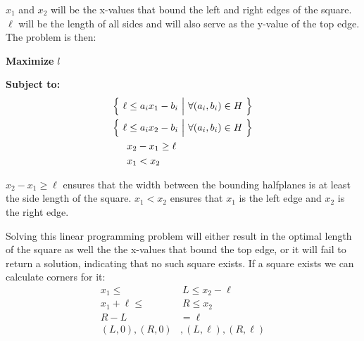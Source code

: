 \documentclass[11pt]{article}
\begin{document}
\begin{enumerate}[(a)]
\begin{solution}
  \(x_1\) and \(x_2\) will be the x-values that bound the left and right edges of the square. \(\ell\) will be the length of all sides and will also serve as the y-value of the top edge.
  The problem is then:

  \textbf{Maximize} \(l\)

  \textbf{Subject to:}
  \begin{align*}
    \Bigl\{ \ \ell &\leq a_i x_1 - b_i \ \Big| \ \forall (a_i, b_i) \in H \ \Bigl\} \\
    \Bigl\{ \ \ell &\leq a_i x_2 - b_i \ \Big| \ \forall (a_i, b_i) \in H \ \Bigl\} \\
    &x_2 - x_1 \geq \ell \\
    &x_1 < x_2
  \end{align*}

  \(x_2 - x_1 \geq \ell\) ensures that the width between the bounding halfplanes is at least the side length of the square. \(x_1 < x_2\) ensures that \(x_1\) is the left edge and \(x_2\) is the
  right edge.

  Solving this linear programming problem will either result in the optimal length of the square as well the the x-values that bound the top edge, or it will
  fail to return a solution, indicating that no such square exists. If a square exists we can calculate corners for it:
  \begin{align*}
    x_1 \leq &\ L \leq x_2 - \ell \\
    x_1 + \ell \leq &\ R \leq x_2 \\
    R - L &= \ell \\
    (L, 0), (R, 0)&, (L, \ell), (R, \ell)
  \end{align*}

\end{solution}

\end{enumerate}
\end{document}
